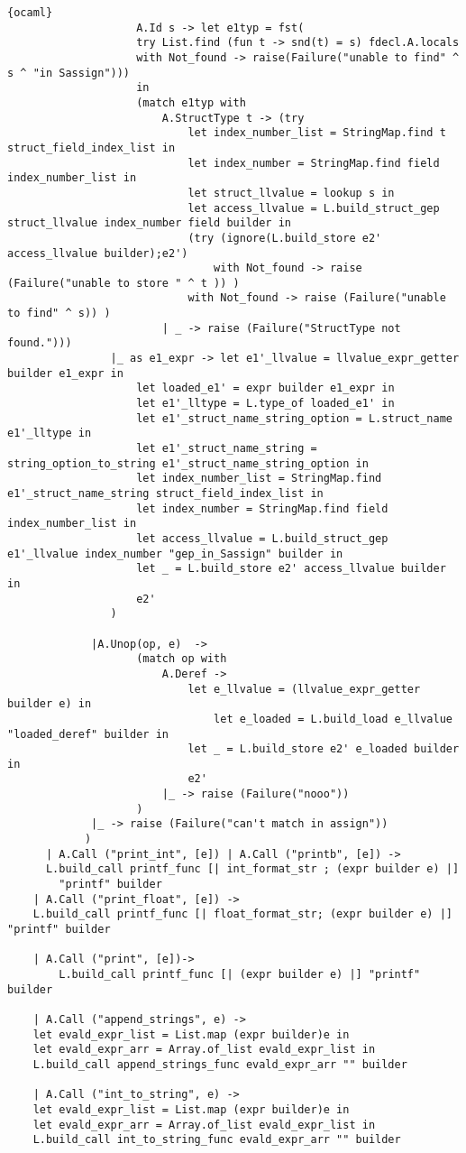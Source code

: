 \begin{lstlisting}{ocaml}
					A.Id s -> let e1typ = fst(
					try List.find (fun t -> snd(t) = s) fdecl.A.locals
					with Not_found -> raise(Failure("unable to find" ^ s ^ "in Sassign")))
					in
					(match e1typ with
						A.StructType t -> (try 
							let index_number_list = StringMap.find t struct_field_index_list in
							let index_number = StringMap.find field index_number_list in
							let struct_llvalue = lookup s in
							let access_llvalue = L.build_struct_gep struct_llvalue index_number field builder in
							(try (ignore(L.build_store e2' access_llvalue builder);e2')
								with Not_found -> raise (Failure("unable to store " ^ t )) )
							with Not_found -> raise (Failure("unable to find" ^ s)) )
						| _ -> raise (Failure("StructType not found.")))
				|_ as e1_expr -> let e1'_llvalue = llvalue_expr_getter builder e1_expr in 
					let loaded_e1' = expr builder e1_expr in
					let e1'_lltype = L.type_of loaded_e1' in
					let e1'_struct_name_string_option = L.struct_name e1'_lltype in
					let e1'_struct_name_string = string_option_to_string e1'_struct_name_string_option in
					let index_number_list = StringMap.find e1'_struct_name_string struct_field_index_list in
					let index_number = StringMap.find field index_number_list in
					let access_llvalue = L.build_struct_gep e1'_llvalue index_number "gep_in_Sassign" builder in
					let _ = L.build_store e2' access_llvalue builder in
					e2'
				)
			
			 |A.Unop(op, e)  ->
					(match op with
						A.Deref ->
							let e_llvalue = (llvalue_expr_getter builder e) in
						        let e_loaded = L.build_load e_llvalue "loaded_deref" builder in 
							let _ = L.build_store e2' e_loaded builder in
							e2'	
						|_ -> raise (Failure("nooo"))
					)
			 |_ -> raise (Failure("can't match in assign"))
			)
      | A.Call ("print_int", [e]) | A.Call ("printb", [e]) ->
	  L.build_call printf_func [| int_format_str ; (expr builder e) |]
	    "printf" builder
    | A.Call ("print_float", [e]) ->
	L.build_call printf_func [| float_format_str; (expr builder e) |] "printf" builder 

    | A.Call ("print", [e])->
        L.build_call printf_func [| (expr builder e) |] "printf" builder

    | A.Call ("append_strings", e) ->
	let evald_expr_list = List.map (expr builder)e in
	let evald_expr_arr = Array.of_list evald_expr_list in
	L.build_call append_strings_func evald_expr_arr "" builder

    | A.Call ("int_to_string", e) ->
	let evald_expr_list = List.map (expr builder)e in
	let evald_expr_arr = Array.of_list evald_expr_list in
	L.build_call int_to_string_func evald_expr_arr "" builder




\end{lstlisting}
